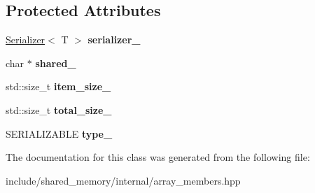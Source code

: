 \subsection*{Protected Attributes}
\begin{DoxyCompactItemize}
\item 
\hyperlink{classshared__memory_1_1Serializer}{Serializer}$<$ T $>$ {\bfseries serializer\+\_\+}\hypertarget{classshared__memory_1_1internal_1_1array__members_a277e877df362970ef3bc3afdc1c405f8}{}\label{classshared__memory_1_1internal_1_1array__members_a277e877df362970ef3bc3afdc1c405f8}

\item 
char $\ast$ {\bfseries shared\+\_\+}\hypertarget{classshared__memory_1_1internal_1_1array__members_a43d6cb2ddca3c64b5ddf9179385e0156}{}\label{classshared__memory_1_1internal_1_1array__members_a43d6cb2ddca3c64b5ddf9179385e0156}

\item 
std\+::size\+\_\+t {\bfseries item\+\_\+size\+\_\+}\hypertarget{classshared__memory_1_1internal_1_1array__members_abd1f5a78fd25466746fcdb172c824007}{}\label{classshared__memory_1_1internal_1_1array__members_abd1f5a78fd25466746fcdb172c824007}

\item 
std\+::size\+\_\+t {\bfseries total\+\_\+size\+\_\+}\hypertarget{classshared__memory_1_1internal_1_1array__members_ac7dc62a93b0836545cd31e824ab89686}{}\label{classshared__memory_1_1internal_1_1array__members_ac7dc62a93b0836545cd31e824ab89686}

\item 
S\+E\+R\+I\+A\+L\+I\+Z\+A\+B\+LE {\bfseries type\+\_\+}\hypertarget{classshared__memory_1_1internal_1_1array__members_a5f899d0844d266a9041766d6f07da183}{}\label{classshared__memory_1_1internal_1_1array__members_a5f899d0844d266a9041766d6f07da183}

\end{DoxyCompactItemize}


The documentation for this class was generated from the following file\+:\begin{DoxyCompactItemize}
\item 
include/shared\+\_\+memory/internal/array\+\_\+members.\+hpp\end{DoxyCompactItemize}
